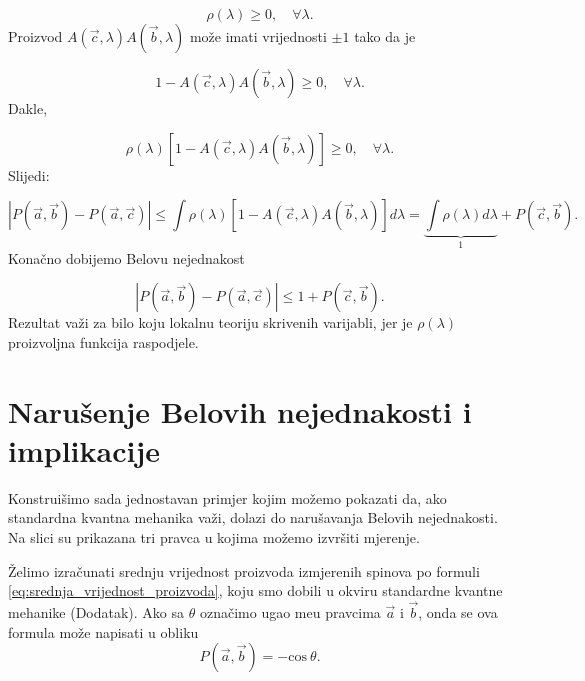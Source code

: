 \begin{equation}
    \rho(\lambda) \ge0 , \quad \forall \lambda.
\end{equation}
Proizvod $A(\vec{c}, \lambda) A(\vec{b}, \lambda)$ može imati vrijednosti $\pm 1$ tako da je

\begin{equation}
    1 - A(\vec{c}, \lambda) A(\vec{b}, \lambda) \ge 0 , \quad \forall \lambda.
\end{equation}
Dakle,

\begin{equation}
    \rho (\lambda)[1 - A(\vec{c}, \lambda) A(\vec{b}, \lambda) ] \ge 0, \quad \forall \lambda.
\end{equation}
Slijedi:


\begin{equation}
    \left|{P(\vec{a}, \vec{b}) - P(\vec{a}, \vec{c})}\right| \le  \int  \rho (\lambda)  [1- A(\vec{c}, \lambda) A(\vec{b}, \lambda)  ]  d\lambda = \underbrace{\int \rho(\lambda)d\lambda}_{1} + P(\vec{c}, \vec{b}).
\end{equation}
Konačno dobijemo Belovu nejednakost

\begin{equation}
    \left|{P(\vec{a}, \vec{b}) - P(\vec{a}, \vec{c})}\right| \le 1 +  P(\vec{c}, \vec{b}).
\end{equation}
Rezultat važi za bilo koju lokalnu teoriju skrivenih varijabli, jer je $\rho(\lambda)$ proizvoljna funkcija raspodjele.

\section{Narušenje Belovih nejednakosti i implikacije}

Konstruišimo sada jednostavan primjer kojim možemo pokazati da, ako standardna kvantna mehanika važi,  dolazi do narušavanja Belovih nejednakosti. Na slici
su prikazana tri pravca u kojima možemo izvršiti mjerenje.

Želimo izračunati srednju vrijednost proizvoda izmjerenih spinova po formuli \eqref{eq:srednja_vrijednost_proizvoda}, koju smo dobili u okviru standardne kvantne mehanike (Dodatak).
Ako sa $\theta$ ozna\v cimo ugao me\dj u pravcima $\vec{a}$ i $\vec{b}$, onda se ova formula mo\v ze napisati u obliku
\begin{equation}
    P(\vec{a},\vec{b}) = -\mathrm{cos} \:\! \theta.
\end{equation}

